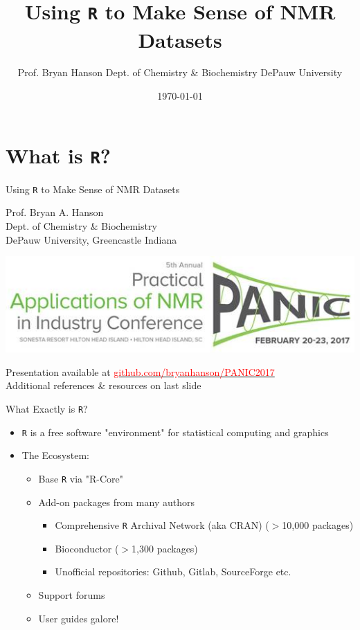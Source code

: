 \documentclass[aspectratio=169]{beamer}\usepackage[]{graphicx}\usepackage[]{color}
\title{Using \texttt{R} to Make Sense of NMR Datasets}
\author{Prof. Bryan Hanson Dept. of Chemistry \& Biochemistry DePauw University}
\date{\today}
\begin{document}
\section*{What is \texttt{R}?}

\begin{frame}{Using \texttt{R} to Make Sense of NMR Datasets}
\begin{center}
Prof. Bryan A. Hanson\\
Dept. of Chemistry \& Biochemistry\\
DePauw University, Greencastle Indiana\\

\begin{center}
  \includegraphics[scale = 0.6]{PANIClogo.jpg}
\end{center}

Presentation available at \href{https://github.com/bryanhanson/PANIC2017}{\textcolor{red}{github.com/bryanhanson/PANIC2017}}\\
Additional references \& resources on last slide
\end{center}
\end{frame}



\begin{frame}{What Exactly is \texttt{R}?}
  \begin{itemize}
    \item \texttt{R} is a free software "environment" for statistical computing and graphics
    \item The Ecosystem:
      \begin{itemize}
        \item Base \texttt{R} via "R-Core"
        \item Add-on packages from many authors
          \begin{itemize}
            \item Comprehensive \texttt{R} Archival Network (aka CRAN) ($>$10,000 packages)
            \item Bioconductor ($>$1,300 packages)
            \item Unofficial repositories: Github, Gitlab, SourceForge etc.
          \end{itemize}
        \item Support forums
        \item User guides galore!
      \end{itemize}
  \end{itemize}
\end{frame}
\end{document}

